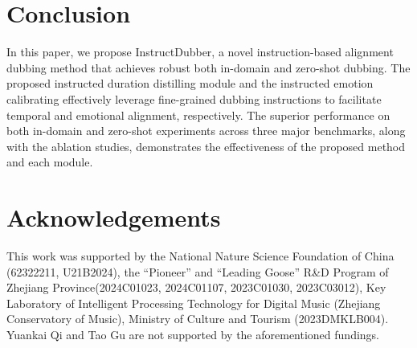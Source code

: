 


\section{Conclusion}
In this paper, we propose InstructDubber, a novel instruction-based alignment dubbing method that achieves robust both in-domain and zero-shot dubbing.
The proposed instructed duration distilling module and the instructed emotion calibrating effectively leverage fine-grained dubbing instructions to facilitate temporal and emotional alignment, respectively.
The superior performance on both in-domain and zero-shot experiments across three major benchmarks, along with the ablation studies, demonstrates the effectiveness of the proposed method and each module.

\section*{Acknowledgements}
 \begin{sloppypar}
This work was supported by the National Nature Science Foundation of China (62322211, U21B2024), the ``Pioneer'' and ``Leading Goose'' R\&D Program of Zhejiang Province(2024C01023, 2024C01107, 2023C01030, 2023C03012), Key Laboratory of Intelligent Processing Technology for Digital Music (Zhejiang Conservatory of Music), Ministry of Culture and Tourism (2023DMKLB004).
Yuankai Qi and Tao Gu are not supported by the aforementioned fundings.
\end{sloppypar}